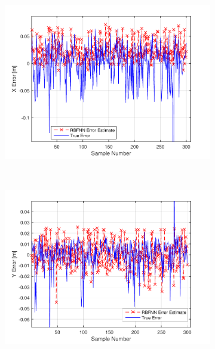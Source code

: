 \begin{figure}
  \begin{subfigure}{0.3\textwidth}
    \includegraphics[width=\textwidth]{figures/chapter4/x_valid}
    \caption{}
  \end{subfigure}
~
  \begin{subfigure}{0.3\textwidth}
    \includegraphics[width=\textwidth]{figures/chapter4/y_valid}
    \caption{}
  \end{subfigure}
~
  \begin{subfigure}{0.3\textwidth}

\end{subfigure}
\end{figure}
